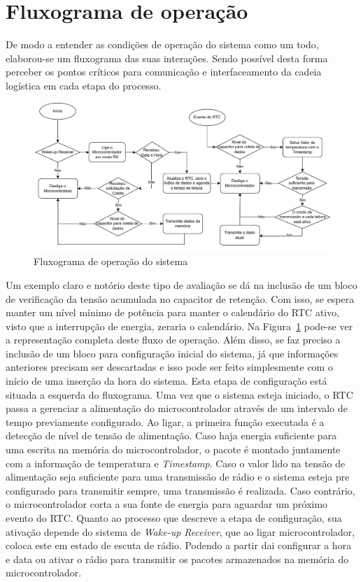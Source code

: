 \section{Fluxograma de operação}
De modo a entender as condições de operação do sistema como um todo, elaborou-se um fluxograma das suas interações. Sendo possível desta forma perceber os pontos críticos para comunicação e interfaceamento da cadeia logística em cada etapa do processo.
\begin{figure}[h!]
  \caption{Fluxograma de operação do sistema}
  \begin{center}
      \includegraphics[scale=0.7]{img/fluxogramaOperacao.drawio.pdf}
  \end{center}
  \label{fig:fluxo}
\end{figure}

Um exemplo claro e notório deste tipo de avaliação se dá na inclusão de um bloco de verificação da tensão acumulada no capacitor de retenção. Com isso, se espera manter um nível mínimo de potência para manter o calendário do RTC ativo, visto que a interrupção de energia, zeraria o calendário.
Na Figura~\ref{fig:fluxo} pode-se ver a representação completa deste fluxo de operação. Além disso, se faz preciso a inclusão de um bloco para configuração inicial do sistema, já que informações anteriores precisam ser descartadas e isso pode ser feito simplesmente com o início de uma inserção da hora do sistema. Esta etapa de configuração está situada a esquerda do fluxograma. Uma vez que o sistema esteja iniciado, o RTC passa a gerenciar a alimentação do microcontrolador através de um intervalo de tempo previamente configurado. Ao ligar, a primeira função executada é a detecção de nível de tensão de alimentação. Caso haja energia suficiente para uma escrita na memória do microcontrolador, o pacote é montado juntamente com a informação de temperatura e \textit{Timestamp}. Caso o valor lido na tensão de alimentação seja suficiente para uma transmissão de rádio e o sistema esteja pre configurado para transmitir sempre, uma transmissão é realizada. Caso contrário, o microcontrolador corta a sua fonte de energia para aguardar um próximo evento do RTC. 
Quanto ao processo que descreve a etapa de configuração, sua ativação depende do sistema de \textit{Wake-up Receiver}, que ao ligar microcontrolador, coloca este em estado de escuta de rádio. Podendo a partir dai configurar a hora e data ou ativar o rádio para transmitir os pacotes armazenados na memória do microcontrolador.



